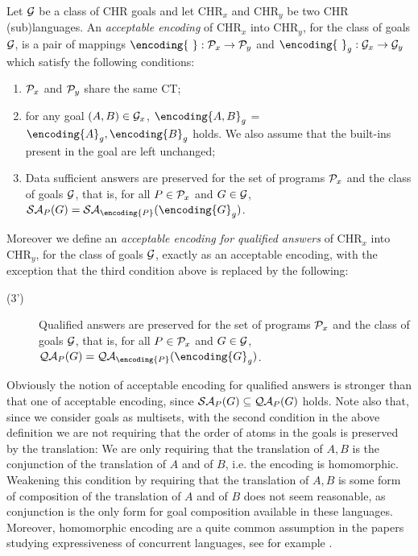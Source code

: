 \begin{definition}\label{def:resenc}
Let ${\cal G}$ be  a class of CHR goals and let CHR$_x$ and CHR$_y$ be two CHR (sub)languages. An {\em acceptable encoding} of CHR$_x$ into CHR$_y$, for the class of goals ${\cal G}$, is a pair of mappings $\encoding{\ } :{\cal P}_{x} \rightarrow {\cal P}_{y}$ and $\encoding{\ }_g:{\cal G}_{x} \rightarrow {\cal G}_{y}$ which satisfy the following conditions:
\begin{enumerate}
 \item ${\cal P}_{x}$ and ${\cal P}_{y}$  share the same CT;
 \item for any goal $(A,B) \in {\cal G}_{x}$, $\encoding{A,B}_g$ = $\encoding{A}_g, \encoding{B}_g$ holds. We also assume that the built-ins present in the goal are left unchanged;
 \item Data sufficient answers are preserved for the set of programs ${\cal P}_{x}$ and the class of goals ${\cal G}$, that is, for all $P\in {\cal P}_{x}$ and $G\in {\cal G}$,
 ${\cal SA}_{P}(G) =  {\cal SA}_{\encoding{P}}(\encoding{G}_g)$.
\end{enumerate}
Moreover we define an  {\em acceptable encoding for qualified answers} of CHR$_x$ into CHR$_y$, for the class of goals ${\cal G}$, exactly as an acceptable encoding, with the exception that the third condition above is replaced by the following:
\begin{description}
 \item[(3')] Qualified answers are preserved for the set of programs ${\cal P}_{x}$ and the class of goals ${\cal G}$, that is, for all $P\in {\cal P}_{x}$ and  $G\in {\cal G}$,
 ${\cal QA}_{P}(G) =  {\cal QA}_{\encoding{P}}(\encoding{G}_g)$.
\end{description}
\end{definition}







Obviously the notion of acceptable encoding for qualified answers is stronger than that one of acceptable encoding, since  ${\cal SA}_{P}(G) \subseteq  {\cal QA}_{P}(G) $ holds.
Note also that, since we consider goals as multisets, with the second condition in the above definition we are not requiring that the order of atoms in the goals is preserved by the translation: We are only requiring that
the translation of $A, B$ is the conjunction of the translation of $A$ and of $B$, i.e. the encoding is homomorphic.
Weakening this condition by requiring that the translation of $A, B$ is some form of composition of the translation of $A$ and of $B$ does not seem reasonable, as conjunction is the only form for goal composition available in these languages.
Moreover, homomorphic encoding are a quite common assumption in the papers studying expressiveness of concurrent languages, see for example \cite{Pal03}.

